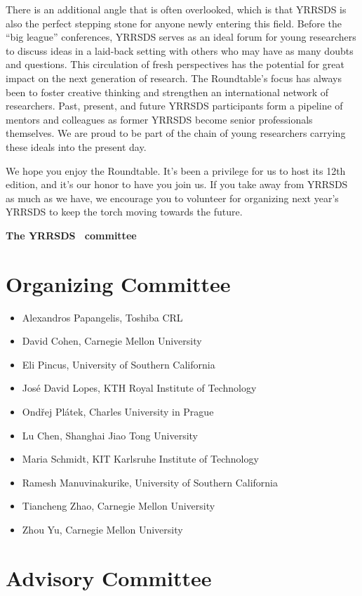 \documentclass[12pt]{article}
\def\EDITION{{12}}  %
\begin{document}
There is an additional angle that is often overlooked, which is that YRRSDS is also the perfect stepping stone for anyone newly entering this field. Before the “big league” conferences, YRRSDS serves as an ideal forum for young researchers to discuss ideas in a laid-back setting with others who may have as many doubts and questions. This circulation of fresh perspectives has the potential for great impact on the next generation of research. The Roundtable’s focus has always been to foster creative thinking and strengthen an international network of researchers. Past, present, and future YRRSDS participants form a pipeline of mentors and colleagues as former YRRSDS become senior professionals themselves. We are proud to be part of the chain of young researchers carrying these ideals into the present day.

We hope you enjoy the Roundtable. It’s been a privilege for us to host its \EDITION th edition, and it’s our honor to have you join us. If you take away from YRRSDS as much as we have, we encourage you to volunteer for organizing next year’s YRRSDS to keep the torch moving towards the future.

\hfill {\bf The YRRSDS \the\year \ committee}
\pagebreak

\section*{Organizing Committee}

\begin{itemize}
\item Alexandros Papangelis, Toshiba CRL
\item David Cohen, Carnegie Mellon University
\item Eli Pincus, University of Southern California
\item José David Lopes, KTH Royal Institute of Technology
\item Ondřej Plátek, Charles University in Prague
\item Lu Chen, Shanghai Jiao Tong University
\item Maria Schmidt, KIT Karlsruhe Institute of Technology
\item Ramesh Manuvinakurike, University of Southern California
\item Tiancheng Zhao, Carnegie Mellon University
\item Zhou Yu, Carnegie Mellon University
\end{itemize}

\section*{Advisory Committee}
\end{document}
